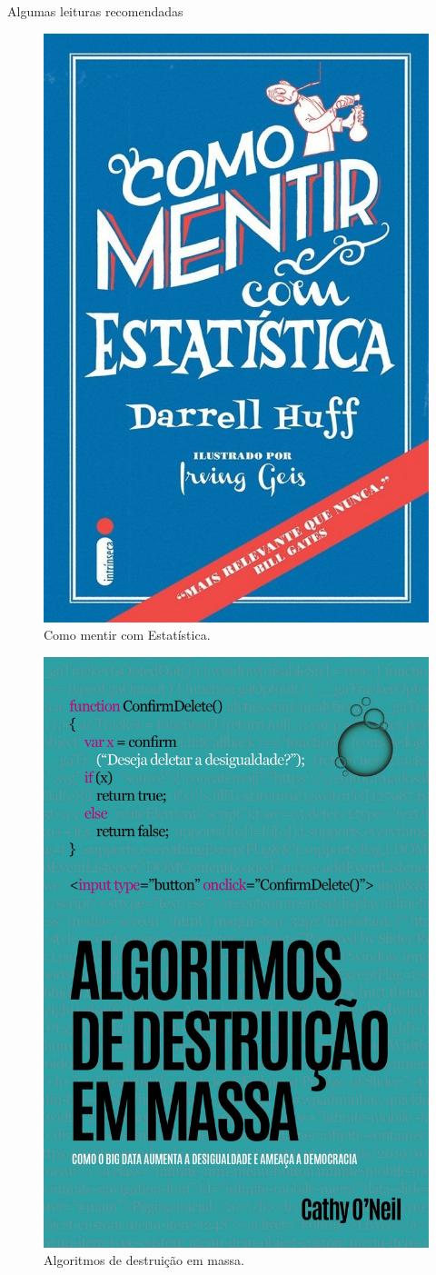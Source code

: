 \documentclass[
  ignorenonframetext,
  serif,
  professionalfont,
  usenames,
  dvipsnames,
  aspectratio = 169]{beamer}
\def\beginAHalfColumn{\begin{minipage}{0.49\textwidth}}%
\def\endColumns{\end{minipage}}%
\begin{document}
\begin{frame}{Algumas leituras recomendadas}
\protect\hypertarget{algumas-leituras-recomendadas-1}{}
\beginAHalfColumn

\begin{figure}

{\centering \includegraphics[width=0.5\linewidth]{./img/mentir} 

}

\caption{Como mentir com Estatística.}\label{fig:unnamed-chunk-15}
\end{figure}

\endColumns
\beginAHalfColumn

\begin{figure}

{\centering \includegraphics[width=0.5\linewidth]{./img/algoritmos} 

}

\caption{Algoritmos de destruição em massa.}\label{fig:unnamed-chunk-16}
\end{figure}

\endColumns
\end{frame}
\end{document}
